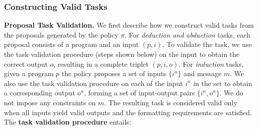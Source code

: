 \documentclass{article}
\begin{document}
\subsubsection{Constructing Valid Tasks}
\label{sec:filter}
\textbf{Proposal Task Validation.} We first describe how we construct valid tasks from the proposals generated by the policy \(\pi\). For \emph{deduction and abduction} tasks, each proposal consists of a program and an input \((p, i)\). To validate the task, we use the task validation procedure (steps shown below) on the input to obtain the correct output \(o\), resulting in a complete triplet \((p, i, o)\). For \emph{induction} tasks, given a program \(p\) the policy proposes a set of inputs \(\{i^n\}\) and message \(m\). We also use the task validation procedure on each of the input \(i^n\) in the set to obtain a corresponding output \(o^n\), forming a set of input-output pairs \(\{i^n, o^n\}\). We do not impose any constraints on \(m\). The resulting task is considered valid only when all inputs yield valid outputs and the formatting requirements are satisfied. The \textbf{task validation procedure} entails:
\end{document}
